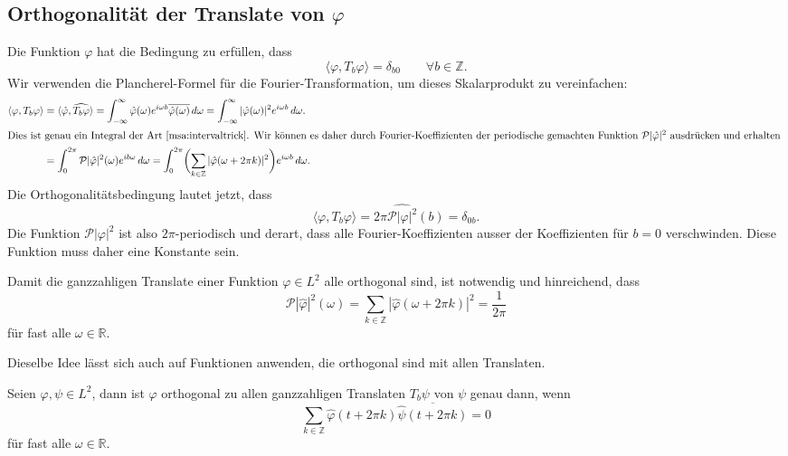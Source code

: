 %
%
\subsection{Orthogonalität der Translate von $\varphi$}
Die Funktion $\varphi$ hat die Bedingung zu erfüllen, dass
\[
\langle \varphi, T_b\varphi\rangle = \delta_{b0}
\qquad\forall b\in\mathbb Z.
\]
Wir verwenden die Plancherel-Formel für die Fourier-Transformation,
um dieses Skalarprodukt zu vereinfachen:
\begin{align*}
\langle \varphi,T_b\varphi\rangle
&=
\langle \hat{\varphi},\widehat{T_b\varphi}\rangle
=
\int_{-\infty}^\infty
\hat{\varphi}(\omega) e^{i\omega b}\overline{\hat{\varphi}(\omega)}
\,d\omega
=
\int_{-\infty}^\infty
|\hat{\varphi}(\omega)|^2 e^{i\omega b}
\,d\omega.
\\
\intertext{Dies ist genau ein Integral der Art~\eqref{msa:intervaltrick}.
Wir können es daher durch Fourier-Koeffizienten der periodische 
gemachten Funktion $\mathcal{P}|\hat{\varphi}|^2$ ausdrücken und
erhalten
}
&=
\int_0^{2\pi}
\mathcal{P}|\hat{\varphi}|^2(\omega) e^{ib\omega}
\,d\omega
=
\int_0^{2\pi}
\biggl(
\sum_{k\in\mathbb Z}
|\hat{\varphi}(\omega + 2\pi k)|^2\biggr)
e^{i\omega b}
\,d\omega.
\end{align*}
Die Orthogonalitätsbedingung lautet jetzt, dass 
\[
\langle \varphi,T_b\varphi\rangle
=
2\pi
\widehat{\mathcal{P}|\varphi|^2}(b)
=
\delta_{0b}.
\]
Die Funktion $\mathcal{P}|\varphi|^2$ ist also $2\pi$-periodisch und
derart, dass alle Fourier-Koeffizienten ausser der Koeffizienten für
$b=0$ verschwinden.
Diese Funktion muss daher eine Konstante sein.

\begin{satz}
\label{satz:msa:orthogonalitaetsbedingung}
Damit die ganzzahligen Translate einer Funktion $\varphi\in L^2$ alle
orthogonal sind, ist notwendig und hinreichend, dass 
\begin{equation}
\mathcal{P}|\hat{\varphi}|^2(\omega)
=
\sum_{k\in\mathbb Z} |\hat{\varphi}(\omega + 2\pi k)|^2
=
\frac1{2\pi}
\label{msa:orthogonalitaetsbedingung}
\end{equation}
für fast alle $\omega\in\mathbb R$.
\end{satz}

Dieselbe Idee lässt sich auch auf Funktionen anwenden, die orthogonal
sind mit allen Translaten.

\begin{satz}
\label{satz:msa:alleorthogonal}
Seien $\varphi,\psi\in L^2$, dann ist $\varphi$ orthogonal zu allen
ganzzahligen Translaten $T_b\psi$  von $\psi$ genau dann, wenn
\begin{equation}
\sum_{k\in\mathbb Z} \hat{\varphi}(t+2\pi k)\overline{\hat{\psi}(t+2\pi k)}
=
0
\end{equation}
für fast alle $\omega\in\mathbb R$.
\end{satz}

